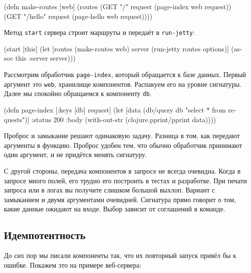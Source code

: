 \begin{english}
  \begin{clojure}
(defn make-routes [web]
  (routes
   (GET "/"      request (page-index web request))
   (GET "/hello" request (page-hello web request))))
  \end{clojure}
\end{english}

\noindent
Метод \verb|start| сервера строит маршруты и передаёт в \verb|run-jetty|:

\begin{english}
  \begin{clojure}
(start [this]
  (let [routes (make-routes web)
        server (run-jetty routes options)]
    (assoc this :server server)))
  \end{clojure}
\end{english}

Рассмотрим обработчик \verb|page-index|, который обращается к базе
данных. Первый аргумент это \verb|web|, хранилище компонентов. Распакуем его
на уровне сигнатуры. Далее мы спокойно обращаемся к компоненту \verb|db|.

\begin{english}
  \begin{clojure}
(defn page-index
  [{:keys [db]} request]
  (let [data (db/query db "select * from requests")]
    {:status 200
     :body (with-out-str
             (clojure.pprint/pprint data))}))
  \end{clojure}
\end{english}


Проброс и замыкание решают одинаковую задачу. Разница в том, как передают
аргументы в функцию. Проброс удобен тем, что обычно обработчик принимают один
аргумент, и не придётся менять сигнатуру.

С другой стороны, передача компонентов в запросе не всегда очевидна. Когда в
запросе много полей, его трудно его построить в тестах и разработке. При печати
запроса или в логах вы получите слишком большой выхлоп. Вариант с замыканием и
двумя аргументами очевидней. Сигнатура прямо говорит о том, какие данные ожидают
на входе. Выбор зависит от соглашений в команде.

\subsection{Идемпотентность}

До сих пор мы писали компоненты так, что их повторный запуск привёл бы к
ошибке. Покажем это на примере веб-сервера:

